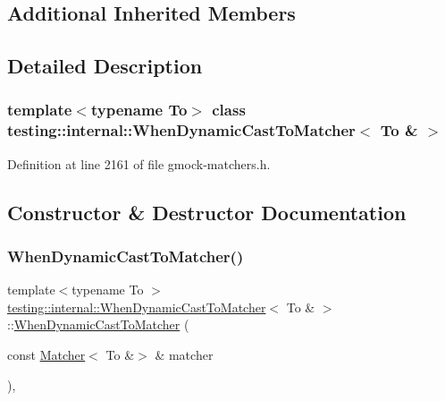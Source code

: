\subsection*{Additional Inherited Members}


\subsection{Detailed Description}
\subsubsection*{template$<$typename To$>$\newline
class testing\+::internal\+::\+When\+Dynamic\+Cast\+To\+Matcher$<$ To \& $>$}



Definition at line 2161 of file gmock-\/matchers.\+h.



\subsection{Constructor \& Destructor Documentation}
\mbox{\label{classtesting_1_1internal_1_1WhenDynamicCastToMatcher_3_01To_01_6_01_4_a1ba7bc63566075d2afe18905e5c7ad76}} 
\subsubsection{\texorpdfstring{When\+Dynamic\+Cast\+To\+Matcher()}{WhenDynamicCastToMatcher()}}
{\footnotesize\ttfamily template$<$typename To $>$ \\
\hyperlink{classtesting_1_1internal_1_1WhenDynamicCastToMatcher}{testing\+::internal\+::\+When\+Dynamic\+Cast\+To\+Matcher}$<$ To \& $>$\+::\hyperlink{classtesting_1_1internal_1_1WhenDynamicCastToMatcher}{When\+Dynamic\+Cast\+To\+Matcher} (\begin{DoxyParamCaption}\item[{const \hyperlink{classtesting_1_1Matcher}{Matcher}$<$ To \&$>$ \&}]{matcher }\end{DoxyParamCaption})\hspace{0.3cm}{\ttfamily [inline]}, {\ttfamily [explicit]}}



